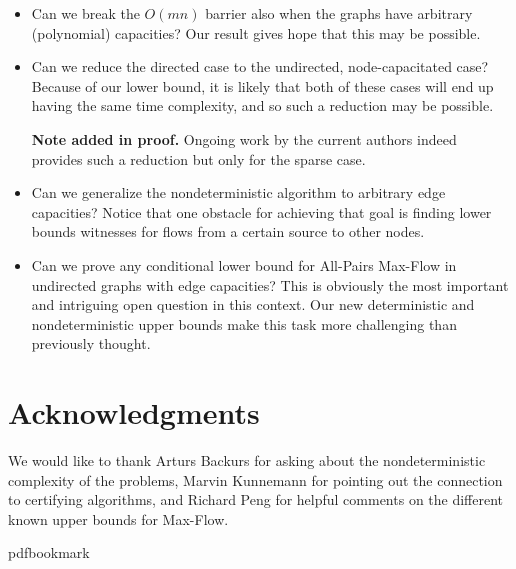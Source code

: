 \documentclass[11pt]{article}
\numberwithin{equation}{section}
\theoremstyle{definition}
\theoremstyle{plain}
\theoremstyle{plain}
\newcommand{\ProblemName}[1]{\textsf{#1}}
\newcommand{\MF}{\ProblemName{Max-Flow}\xspace}
\newcommand{\APMF}{\ProblemName{All-Pairs Max-Flow}\xspace}
\begin{document}
\begin{itemize}
\item Can we break the $O(mn)$ barrier also when the graphs have arbitrary (polynomial) capacities? Our result gives hope that this may be possible.

\item Can we reduce the directed case to the undirected, node-capacitated case? Because of our lower bound, it is likely that both of these cases will end up having the same time complexity, and so such a reduction may be possible.

\smallskip
\textbf{Note added in proof.}
Ongoing work by the current authors indeed provides such a reduction but only for the sparse case.
%

\item Can we generalize the nondeterministic algorithm to arbitrary edge capacities? Notice that one obstacle for achieving that goal is finding lower bounds witnesses for flows from a certain source to other nodes.

\item Can we prove any conditional lower bound for \APMF in undirected graphs with edge capacities? This is obviously the most important and intriguing open question in this context. Our new deterministic and nondeterministic upper bounds make this task more challenging than previously thought.
\end{itemize}

%
\section{Acknowledgments}   %
We would like to thank Arturs Backurs for asking about the nondeterministic complexity of the problems, Marvin Kunnemann for pointing out the connection to certifying algorithms, and Richard Peng for helpful comments on the different known upper bounds for \MF.


\newcommand{\prelim}{Preliminary version in\ }
\providecommand{\bibhead}[1]{}
\expandafter\ifx\csname pdfbookmark\endcsname\relax%
  \providecommand{\tocrefpdfbookmark}{}
\else\providecommand{\tocrefpdfbookmark}{%
   \hypertarget{tocreferences}{}%
   \pdfbookmark[1]{References}{tocreferences}}%
\fi
\end{document}
